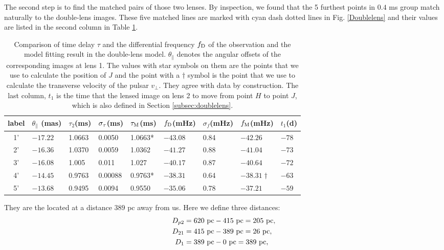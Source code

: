 \documentclass[useAMS,usenatbib]{mn2e}
\begin{document}
The second step is to find the matched pairs of those two lenses. By inspection, we found that the 5 furthest points in $0.4$ ms group match naturally to the double-lens images. These five matched lines are marked with cyan dash dotted lines in Fig. \ref{Doublelens} and their values are listed in the second column in Table \ref{table:double_lens_compare}. 
\begin{table}
\centering
\begin{tabular}{c|llllllll}
\hline
label&$\theta_{\parallel}$ (mas)  & $\tau_2$(ms) & $\sigma_{\rm \tau}$(ms)  & $\tau_{\rm M}$(ms) & $f_{\rm D}$(mHz)  &$\sigma_{f}$(mHz)      &  $f_{\rm M}$(mHz)& $t_1$(d) \\ \hline
1'& $-17.22$  &  1.0663     &0.0050    & 1.0663*        & $-43.08$    &0.84   & $-42.26$           & $-78$\\
 2'& $-16.36$  &    1.0370     &0.0059    & 1.0362       & $-41.27$    & 0.88   & $-41.04$          & $-73$\\ 
3'& $-16.08$  &   1.005    &0.011   & 1.027          & $-40.17$    &   0.87     & $-40.64$          & $-72$\\ 
 4'& $-14.45$  &   0.9763    &0.00088   & 0.9763*       & $-38.31$     &0.64    & $-38.31\dagger$  & $-63$\\ 
5'& $-13.68$  &    0.9495     &0.0094    & 0.9550       & $-35.06$     &0.78    & $-37.21$          &$-59$\\ 
 \hline
\end{tabular}
\caption{Comparison of time delay $\tau$ and the differential
  frequency $f_{\rm D}$ of the observation and the model fitting result in the
  double-lens model. $\theta_{\parallel}$ denotes the angular offsets
  of the corresponding images at lens 1. 
The values with star symbols on them are the points that we use to
calculate the position of $J$ and the point with a $\dagger$ symbol is
the point that we use to calculate the transverse velocity of the pulsar $v_{\bot}$.  They agree with data by construction. The last column, $t_1$ is the time that the lensed image on lens 2 to move from point $H$ to point $J$, which is also defined in Section \ref{subsec:doublelens}.}
\label{table:double_lens_compare}
\end{table}
They are the located at a distance $389$ pc away from us. Here we define three distances:
\begin{equation}
\begin{aligned}
D_{p2}&=620~{\rm pc}-415~{\rm pc} =205~{\rm pc},\\
D_{21}&=415~{\rm pc}-389~{\rm pc} =26~{\rm pc},\\
D_{1}&=389~{\rm pc}- 0~{\rm pc} = 389~{\rm pc}, 
\end{aligned} 
\end{equation}
\end{document}
